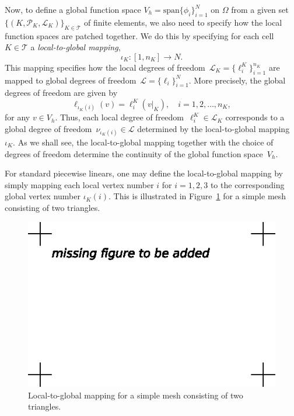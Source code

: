 Now, to define a global function space $V_h = \mathrm{span}
\{\phi_i\}_{i=1}^N$ on $\Omega$ from a given set $\{(K,
\mathcal{P}_K,\mathcal{L}_K)\}_{K\in\mathcal{T}}$ of finite elements,
we also need to specify how the local function spaces are patched
together. We do this by specifying for each cell $K \in \mathcal{T}$ a
\emph{local-to-global mapping},
\begin{equation}
  \iota_K : [1,n_K] \rightarrow N.
\end{equation}
This mapping specifies how the local degrees of freedom~$\mathcal{L}_K
= \{\ell_i^K\}_{i=1}^{n_K}$ are mapped to global degrees of
freedom~$\mathcal{L} = \{\ell_i\}_{i=1}^N$. More precisely, the global
degrees of freedom are given by
\begin{equation} \label{eq:nodemapping}
  \ell_{\iota_K(i)}(v) = \ell^K_i(v|_K), \quad i = 1,2,\ldots,n_K,
\end{equation}
for any $v\in V_h$. Thus, each local degree of freedom~$\ell^K_i \in
\mathcal{L}_K$ corresponds to a global degree of
freedom~$\nu_{\iota_K(i)} \in \mathcal{L}$ determined by the
local-to-global mapping $\iota_K$. As we shall see, the
local-to-global mapping together with the choice of degrees of freedom
determine the continuity of the global function space~$V_h$.

For standard piecewise linears, one may define the local-to-global
mapping by simply mapping each local vertex number $i$ for $i=1,2,3$
to the corresponding global vertex number $\iota_K(i)$. This is
illustrated in Figure~\ref{fig:dofmap} for a simple mesh consisting
of two triangles.

\begin{figure}
  \begin{center}
    \includegraphics[width=\largewidth]{chapters/kirby-7/eps/missing-figure.eps}
    \caption{Local-to-global mapping for a simple mesh consisting of
      two triangles.}
    \label{fig:dofmap}
  \end{center}
\end{figure}

